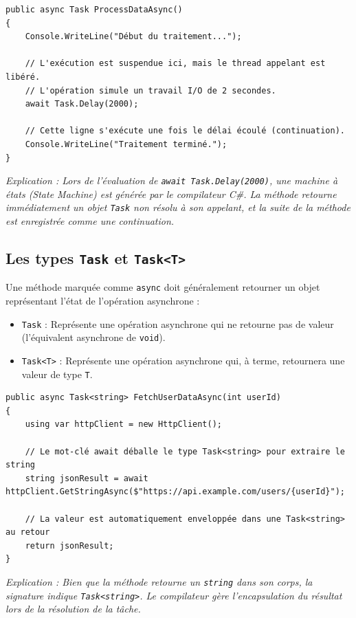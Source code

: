 \begin{lstlisting}[language={[Sharp]C}]
public async Task ProcessDataAsync()
{
    Console.WriteLine("Début du traitement...");

    // L'exécution est suspendue ici, mais le thread appelant est libéré.
    // L'opération simule un travail I/O de 2 secondes.
    await Task.Delay(2000); 

    // Cette ligne s'exécute une fois le délai écoulé (continuation).
    Console.WriteLine("Traitement terminé.");
}
\end{lstlisting}
\textit{Explication : Lors de l'évaluation de \texttt{await Task.Delay(2000)}, une machine à états (State Machine) est générée par le compilateur C\#. La méthode retourne immédiatement un objet \texttt{Task} non résolu à son appelant, et la suite de la méthode est enregistrée comme une continuation.}

\subsection{Les types \texttt{Task} et \texttt{Task<T>}}

Une méthode marquée comme \texttt{async} doit généralement retourner un objet représentant l'état de l'opération asynchrone :
\begin{itemize}
    \item \texttt{Task} : Représente une opération asynchrone qui ne retourne pas de valeur (l'équivalent asynchrone de \texttt{void}).
    \item \texttt{Task<T>} : Représente une opération asynchrone qui, à terme, retournera une valeur de type \texttt{T}.
\end{itemize}

\begin{lstlisting}[language={[Sharp]C}]
public async Task<string> FetchUserDataAsync(int userId)
{
    using var httpClient = new HttpClient();
    
    // Le mot-clé await déballe le type Task<string> pour extraire le string
    string jsonResult = await httpClient.GetStringAsync($"https://api.example.com/users/{userId}");
    
    // La valeur est automatiquement enveloppée dans une Task<string> au retour
    return jsonResult; 
}
\end{lstlisting}
\textit{Explication : Bien que la méthode retourne un \texttt{string} dans son corps, la signature indique \texttt{Task<string>}. Le compilateur gère l'encapsulation du résultat lors de la résolution de la tâche.}

